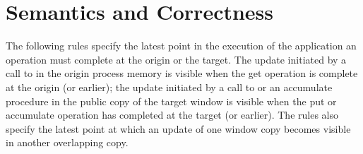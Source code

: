 \section{Semantics and Correctness}
\label{sec:1sided-semantics}


The following rules specify
the latest point in the execution of the application an operation must complete at the origin or
the target.
The update initiated by a
call to  in the origin process memory is visible when the get
operation is complete at the origin (or earlier); the update initiated by a
call to  or
an accumulate procedure in the public copy of the target window is visible
when the put or accumulate operation has completed at the target (or earlier).  The
rules
also specify
the latest
point at which an update of one window copy becomes visible in another
overlapping copy. 

